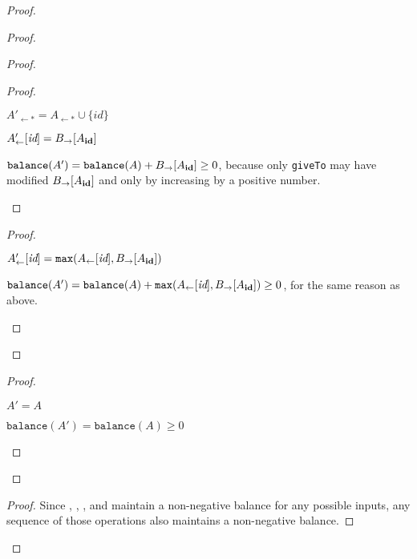 \documentclass[9pt]{article}   	%
\begin{document}
\begin{proof}
	\begin{proof}
		\begin{proof}
			\begin{proof}
				\begin{pfenum}
					\item $A'_{\leftarrow *} = A_{\leftarrow *} \cup \{ \textit{id} \}$
					\item $A'_\leftarrow [\textit{id}] = B_{\rightarrow}[A_{\scriptsize\textbf{id}}]$
					\item $\texttt{balance}(A') = \texttt{balance}(A) +  B_{\rightarrow}[A_{\scriptsize\textbf{id}}] \geq 0$, because only \texttt{giveTo} may have modified $B_{\rightarrow}[A_{\scriptsize\textbf{id}}]$ and only by increasing by a positive number. 
				\end{pfenum}
			\end{proof}
			
			\begin{proof}
				\begin{pfenum}
					\item $A'_\leftarrow [\textit{id}] = \texttt{max}(A_\leftarrow [\textit{id}], B_{\rightarrow}[A_{\scriptsize\textbf{id}}])$
					\item $\texttt{balance}(A') = \texttt{balance}(A) +  \texttt{max}(A_\leftarrow [\textit{id}], B_{\rightarrow}[A_{\scriptsize\textbf{id}}]) \geq 0$, for the same reason as above.
				\end{pfenum}
			\end{proof}

			
		\end{proof}
		
		\begin{proof}
			\begin{pfenum}
				\item $A' = A$
				\item $\texttt{balance}(A') = \texttt{balance}(A) \geq 0$
			\end{pfenum}
		\end{proof}		
	\end{proof}

	\qedstep
	\begin{proof}
		Since , , , and  maintain a non-negative balance for any possible inputs, any sequence of those operations also maintains a non-negative balance.
	\end{proof}
\end{proof}
\end{document}
